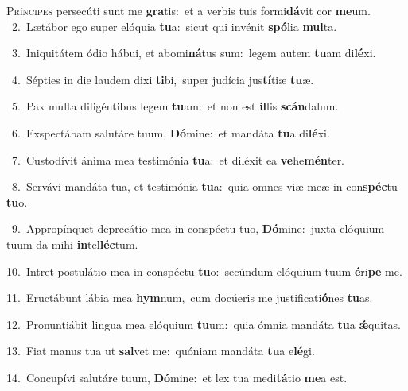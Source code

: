 \lettrine{\initial\textcolor{\initialcolor}{P}}{ríncipes} persecúti sunt me \textbf{gra}\-tis:~\star et a verbis tuis formi\-\textbf{dá}\-vit cor \textbf{me}\-um.\\
{\numbfont\textcolor{\numbcolor}{~2.}}~Lætábor ego super elóquia \textbf{tu}\-a:~\star sicut qui invénit \textbf{spó}\-lia \textbf{mul}\-ta.\par
{\numbfont\textcolor{\numbcolor}{~3.}}~Iniquitátem ódio hábui, et abomi\-\textbf{ná}\-tus sum:~\star legem autem \textbf{tu}\-am di\-\textbf{lé}\-xi.\par
{\numbfont\textcolor{\numbcolor}{~4.}}~Sépties in die laudem dixi \textbf{ti}\-bi,~\star super judícia jus\-\textbf{tí}\-tiæ \textbf{tu}\-æ.\par
{\numbfont\textcolor{\numbcolor}{~5.}}~Pax multa diligéntibus legem \textbf{tu}\-am:~\star et non est \textbf{il}\-lis \textbf{scán}\-dalum.\par
{\numbfont\textcolor{\numbcolor}{~6.}}~Exspectábam salutáre tuum, \textbf{Dó}\-mine:~\star et mandáta \textbf{tu}\-a di\-\textbf{lé}\-xi.\par
{\numbfont\textcolor{\numbcolor}{~7.}}~Custodívit ánima mea testimónia \textbf{tu}\-a:~\star et diléxit ea \textbf{ve}\-he\-\textbf{mén}\-ter.\par
{\numbfont\textcolor{\numbcolor}{~8.}}~Servávi mandáta tua, et testimónia \textbf{tu}\-a:~\star quia omnes viæ meæ in con\-\textbf{spéc}\-tu \textbf{tu}\-o.\par
{\numbfont\textcolor{\numbcolor}{~9.}}~Appropínquet deprecátio mea in conspéctu tuo, \textbf{Dó}\-mine:~\star juxta elóquium tuum da mihi \textbf{in}\-tel\-\textbf{léc}\-tum.\par
{\numbfont\textcolor{\numbcolor}{10.}}~Intret postulátio mea in conspéctu \textbf{tu}\-o:~\star secúndum elóquium tuum \textbf{é}\-ri\textbf{pe} me.\par
{\numbfont\textcolor{\numbcolor}{11.}}~Eructábunt lábia mea \textbf{hym}\-num,~\star cum docúeris me justificati\-\textbf{ó}\-nes \textbf{tu}\-as.\par
{\numbfont\textcolor{\numbcolor}{12.}}~Pronuntiábit lingua mea elóquium \textbf{tu}\-um:~\star quia ómnia mandáta \textbf{tu}\-a \textbf{ǽ}\-quitas.\par
{\numbfont\textcolor{\numbcolor}{13.}}~Fiat manus tua ut \textbf{sal}\-vet me:~\star quóniam mandáta \textbf{tu}\-a e\-\textbf{lé}\-gi.\par
{\numbfont\textcolor{\numbcolor}{14.}}~Concupívi salutáre tuum, \textbf{Dó}\-mine:~\star et lex tua medi\-\textbf{tá}\-tio \textbf{me}\-a est.\par
